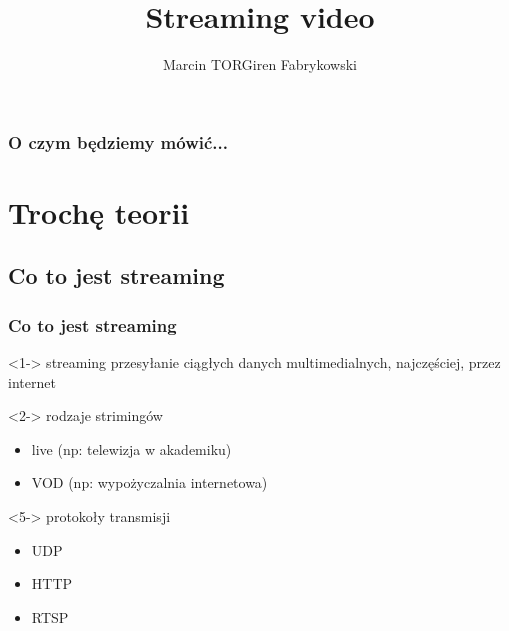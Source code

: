 \documentclass[10pt]{beamer}
\author{Marcin TORGiren Fabrykowski}
\title{Streaming video}
\begin{document}
\begin{frame}
	\titlepage
\end{frame}
\begin{frame}
	\frametitle{O czym będziemy mówić...}
	\tableofcontents
\end{frame}
\section{Trochę teorii}
\subsection{Co to jest streaming}
\begin{frame}
	\frametitle{Co to jest streaming}
	\begin{block}<1->
	{streaming}
	przesyłanie ciągłych danych multimedialnych, najczęściej, przez internet
	\end{block}
	\begin{block}<2->
	{rodzaje strimingów}
	\begin{itemize}
		\item<3-> live (np: telewizja w akademiku)
		\item<4-> VOD (np: wypożyczalnia internetowa)
	\end{itemize}
	\end{block}
	\begin{block}<5->
	{protokoły transmisji}
	\begin{itemize}
		\item<6-> UDP
		\item<7-> HTTP
		\item<8-> RTSP
	\end{itemize}
	\end{block}
\end{frame}
\end{document}
